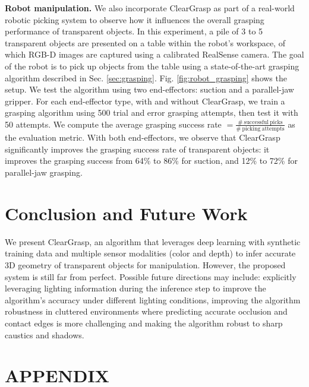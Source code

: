 \documentclass[letterpaper, 10 pt, conference]{ieeeconf}
\newcommand{\myparagraph}[1]{\vspace{0.03in}\noindent\textbf{#1}}
\begin{document}
\myparagraph{Robot manipulation.}
We also incorporate ClearGrasp as part of a real-world robotic picking system to observe how it influences the overall grasping performance of transparent objects. In this experiment, a pile of 3 to 5 transparent objects are presented on a table within the robot's workspace, of which RGB-D images are captured using a calibrated RealSense camera. The goal of the robot is to pick up objects from the table using a state-of-the-art grasping algorithm described in Sec. \ref{sec:grasping}. Fig. \ref{fig:robot_grasping} shows the setup. 
We test the algorithm using two end-effectors: suction and a parallel-jaw gripper. For each end-effector type, with and without ClearGrasp, we train a grasping algorithm using 500 trial and error grasping attempts, then test it with 50 attempts. We compute the average grasping success rate $=\frac{\mathrm{\#~successful~picks}}{\mathrm{\#~picking~attempts}}$  \cite{zeng2018learning} as the evaluation metric.
With both end-effectors, we observe that ClearGrasp significantly improves the grasping success rate of transparent objects: it improves the grasping success from  64\%  to 86\% for suction, and 12\%  to 72\% for parallel-jaw grasping.



\section{Conclusion and Future Work} 
\label{sec:conclusion}
We present ClearGrasp, an algorithm that leverages deep learning with synthetic training data and multiple sensor modalities (color and depth) to infer accurate 3D geometry of transparent objects for manipulation.
However, the proposed system is still far from perfect. Possible future directions may include: explicitly leveraging lighting information during the inference step to improve the algorithm's accuracy under different lighting conditions, improving the algorithm robustness in cluttered environments where predicting accurate occlusion and contact edges is more challenging and making the algorithm robust to sharp caustics and shadows.



\newpage





\clearpage
\section*{APPENDIX}
\end{document}
